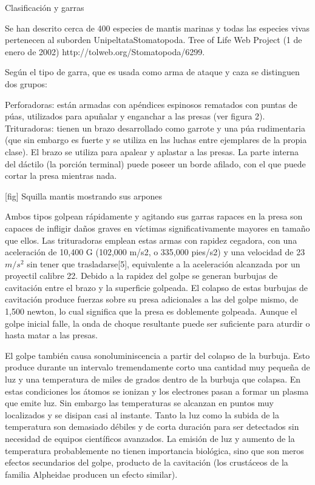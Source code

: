 \documentclass[10pt,letterpaper,twocolumn]{article}
\begin{document}
Clasificación y garras

Se han descrito cerca de 400 especies de mantis marinas y todas las especies vivas pertenecen al suborden Unipeltata{Stomatopoda. Tree of Life Web Project (1 de enero de 2002) http://tolweb.org/Stomatopoda/6299}.

Según el tipo de garra, que es usada como arma de ataque y caza se distinguen dos grupos:

     Perforadoras: están armadas con apéndices espinosos rematados con puntas de púas, utilizados para apuñalar y enganchar a las presas (ver figura 2).
     Trituradoras: tienen un brazo desarrollado como garrote y una púa rudimentaria (que sin embargo es fuerte y se utiliza en las luchas entre ejemplares de la propia clase). El brazo se utiliza para apalear y aplastar a las presas. La parte interna del dáctilo (la porción terminal) puede poseer un borde afilado, con el que puede cortar la presa mientras nada.
    
[fig] Squilla mantis mostrando sus arpones


Ambos tipos golpean rápidamente y agitando sus garras rapaces en la presa son capaces de infligir daños graves en víctimas significativamente mayores en tamaño que ellos. Las trituradoras emplean estas armas con rapidez cegadora, con una aceleración de 10,400 G (102,000 m/s2, o 335,000 pies/s2) y una velocidad de 23 $m/s ^2 $ sin tener que trasladarse[5], equivalente a la aceleración alcanzada por un proyectil calibre 22. Debido a la rapidez del golpe se generan burbujas de cavitación entre el brazo y la superficie golpeada. El colapso de estas burbujas de cavitación produce fuerzas sobre su presa adicionales a las del golpe mismo, de 1,500 newton, lo cual significa que la presa es doblemente golpeada. Aunque el golpe inicial falle, la onda de choque resultante puede ser suficiente para aturdir o hasta matar a las presas.

El golpe también causa sonoluminiscencia a partir del colapso de la burbuja. Esto produce durante un intervalo tremendamente corto una cantidad muy pequeña de luz y una temperatura de miles de grados dentro de la burbuja que colapsa. En estas condiciones los átomos se ionizan y los electrones pasan a formar un plasma que emite luz. Sin embargo las temperaturas se alcanzan en puntos muy localizados y se disipan casi al instante. Tanto la luz como la subida de la temperatura son demasiado débiles y de corta duración para ser detectados sin necesidad de equipos científicos avanzados. La emisión de luz y aumento de la temperatura probablemente no tienen importancia biológica, sino que son meros efectos secundarios del golpe, producto de la cavitación (los crustáceos de la familia Alpheidae producen un efecto similar).
\end{document}
